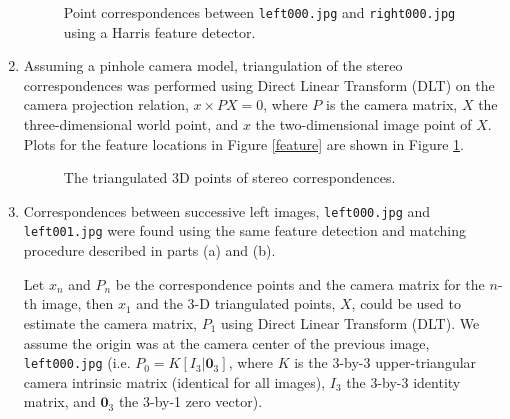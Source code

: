 \documentclass[letter, 10pt]{article}
\begin{document}
\begin{onehalfspacing}
\begin{enumerate}[leftmargin=2em,label={\alph*)}]
\begin{figure}[b!]
	\caption{Point correspondences between \texttt{left000.jpg} and \texttt{right000.jpg} using a Harris feature detector.}
\end{figure}

\item %
Assuming a pinhole camera model, triangulation of the stereo correspondences was performed using Direct Linear Transform (DLT) on the camera projection relation, $x\times PX = 0$, where $P$ is the camera matrix, $X$ the three-dimensional world point, and $x$ the two-dimensional image point of $X$. Plots for the feature locations in Figure \ref{feature} are shown in Figure \ref{3d}.

\begin{figure}[h!]
	\centering
	\caption{The triangulated 3D points of stereo correspondences.}
	\label{3d}
\end{figure}

\item %
Correspondences between successive left images, \texttt{left000.jpg} and \texttt{left001.jpg} were found using the same feature detection and matching procedure described in parts (a) and (b).

Let $x_n$ and $P_n$ be the correspondence points and the camera matrix for the $n$-th image, then $x_1$ and the 3-D triangulated points, $X$, could be used to estimate the camera matrix, $P_1$ using Direct Linear Transform (DLT). We assume the origin was at the camera center of the previous image, \texttt{left000.jpg} (i.e. $P_0 = K[I_3 | \textbf{0}_3]$, where $K$ is the 3-by-3 upper-triangular camera intrinsic matrix (identical for all images), $I_3$ the 3-by-3 identity matrix, and $\textbf{0}_3$ the 3-by-1 zero vector).


\end{enumerate}
\end{onehalfspacing}
\end{document}
